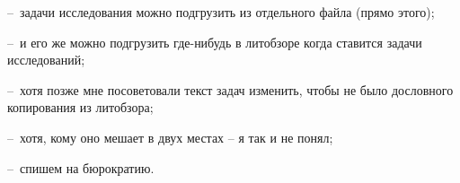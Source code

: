
--~задачи исследования можно подгрузить из отдельного файла (прямо этого);

--~и его же можно подгрузить где-нибудь в литобзоре когда ставится задачи исследований;

--~хотя позже мне посоветовали текст задач изменить, чтобы не было дословного копирования из литобзора;

--~хотя, кому оно мешает в двух местах -- я так и не понял;

--~спишем на бюрократию.